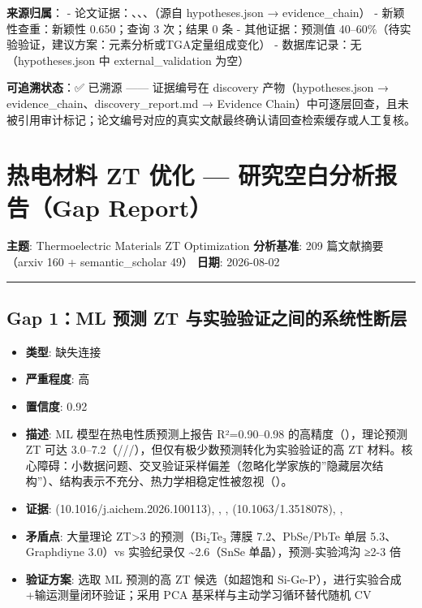 \documentclass[12pt,a4paper]{ctexart}
\providecommand{\tightlist}{%
  \setlength{\itemsep}{0pt}\setlength{\parskip}{0pt}}
\begin{document}
\textbf{来源归属}： - 论文证据：\texttt{\cite{TE048}}、\texttt{\cite{TE035}}、\texttt{\cite{TE037}}、\texttt{\cite{TE051}}（源自 hypotheses.json → evidence\_chain） - 新颖性查重：新颖性 0.650；查询 3 次；结果 0 条 - 其他证据：预测值 40--60\%（待实验验证，建议方案：元素分析或TGA定量组成变化） - 数据库记录：无（hypotheses.json 中 external\_validation 为空）

\textbf{可追溯状态}：✅ 已溯源 ------ 证据编号在 discovery 产物（hypotheses.json → evidence\_chain、discovery\_report.md → Evidence Chain）中可逐层回查，且未被引用审计标记；论文编号对应的真实文献最终确认请回查检索缓存或人工复核。

\section{热电材料 ZT 优化 --- 研究空白分析报告（Gap Report）}\label{gap:ux70edux7535ux6750ux6599-zt-ux4f18ux5316-ux7814ux7a76ux7a7aux767dux5206ux6790ux62a5ux544agap-report}

\textbf{主题}: Thermoelectric Materials ZT Optimization \textbf{分析基准}: 209 篇文献摘要（arxiv 160 + semantic\_scholar 49） \textbf{日期}: 2026-08-02

\begin{center}\rule{0.5\linewidth}{0.5pt}\end{center}

\subsection{Gap 1：ML 预测 ZT 与实验验证之间的系统性断层}\label{gap:gap-1ml-ux9884ux6d4b-zt-ux4e0eux5b9eux9a8cux9a8cux8bc1ux4e4bux95f4ux7684ux7cfbux7edfux6027ux65adux5c42}

\begin{itemize}
\tightlist
\item
  \textbf{类型}: 缺失连接
\item
  \textbf{严重程度}: 高
\item
  \textbf{置信度}: 0.92
\item
  \textbf{描述}: ML 模型在热电性质预测上报告 R²=0.90--0.98 的高精度（\cite{TE057}），理论预测 ZT 可达 3.0--7.2（\cite{TE062}/\cite{TE096}/\cite{TE009}/\cite{TE002}），但仅有极少数预测转化为实验验证的高 ZT 材料。核心障碍：小数据问题、交叉验证采样偏差（忽略化学家族的''隐藏层次结构''）、结构表示不充分、热力学相稳定性被忽视（\cite{TE057}）。
\item
  \textbf{证据}: \cite{TE057} (10.1016/j.aichem.2026.100113), \cite{TE058}, \cite{TE011}, \cite{TE062} (10.1063/1.3518078), \cite{TE096}, \cite{TE009}
\item
  \textbf{矛盾点}: 大量理论 ZT\textgreater3 的预测（Bi₂Te₃ 薄膜 7.2、PbSe/PbTe 单层 5.3、Graphdiyne 3.0）vs 实验纪录仅 \textasciitilde2.6（SnSe 单晶），预测-实验鸿沟 ≥2-3 倍
\item
  \textbf{验证方案}: 选取 ML 预测的高 ZT 候选（如超饱和 Si-Ge-P），进行实验合成+输运测量闭环验证；采用 PCA 基采样与主动学习循环替代随机 CV
\end{itemize}
\end{document}
